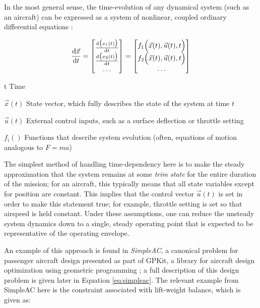 In the most general sense, the time-evolution of any dynamical system (such as an aircraft) can be expressed as a system of nonlinear, coupled ordinary differential equations \cite{Betts2009}:

\begin{equation}
    \frac{\mathrm{d} \vec{x}}{\mathrm{d} t} =
    \begin{bmatrix}
        \frac{\mathrm{d} \big(x_1(t)\big)}{\mathrm{d} t} \\
        \frac{\mathrm{d} \big(x_2(t)\big)}{\mathrm{d} t} \\
        \dots                      \\
    \end{bmatrix} =
    \begin{bmatrix}
        f_1\Big(\vec{x}(t), \vec{u}(t), t\Big) \\
        f_2\Big(\vec{x}(t), \vec{u}(t), t\Big) \\
        \dots                                  \\
    \end{bmatrix}
    \label{eq:ode}
\end{equation}

\begin{eqexpl}
    \item{t} Time
    \item{$\vec{x}(t)$} State vector, which fully describes the state of the system at time $t$
    \item{$\vec{u}(t)$} External control inputs, such as a surface deflection or throttle setting
    \item{$f_i()$} Functions that describe system evolution (often, equations of motion analogous to $F=ma$)
\end{eqexpl}

The simplest method of handling time-dependency here is to make the steady approximation that the system remains at some \textit{trim state} for the entire duration of the mission; for an aircraft, this typically means that all state variables except for position are constant. This implies that the control vector $\vec{u}(t)$ is set in order to make this statement true; for example, throttle setting is set so that airspeed is held constant. Under these assumptions, one can reduce the unsteady system dynamics down to a single, steady operating point that is expected to be representative of the operating envelope.

An example of this approach is found in \textit{SimpleAC}, a canonical problem for passenger aircraft design presented as part of GPKit, a library for aircraft design optimization using geometric programming \cite{gpkit}; a full description of this design problem is given later in Equation \ref{eq:simpleac}. The relevant example from SimpleAC here is the constraint associated with lift-weight balance, which is given as:

